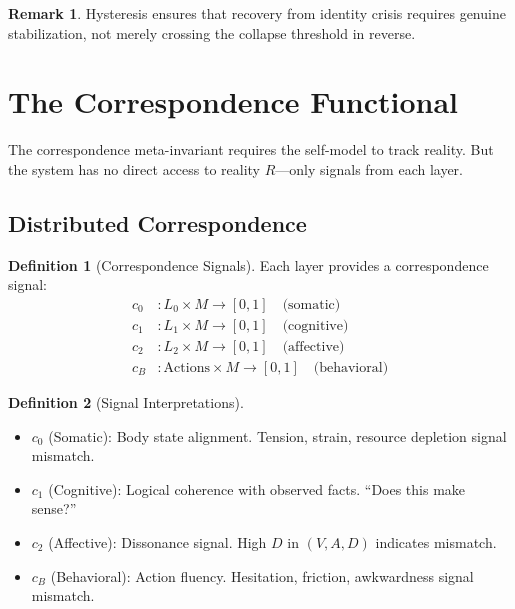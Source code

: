 \documentclass[12pt,a4paper]{article}
\theoremstyle{definition}
\newtheorem{definition}{Definition}[section]
\newtheorem{remark}{Remark}[section]
\begin{document}
\begin{remark}
Hysteresis ensures that recovery from identity crisis requires genuine stabilization, not merely crossing the collapse threshold in reverse.
\end{remark}

\section{The Correspondence Functional}

The correspondence meta-invariant requires the self-model to track reality. But the system has no direct access to reality $R$---only signals from each layer.

\subsection{Distributed Correspondence}

\begin{definition}[Correspondence Signals]
Each layer provides a correspondence signal:
\begin{align}
c_0 &: L_0 \times M \to [0,1] \quad \text{(somatic)} \\
c_1 &: L_1 \times M \to [0,1] \quad \text{(cognitive)} \\
c_2 &: L_2 \times M \to [0,1] \quad \text{(affective)} \\
c_B &: \text{Actions} \times M \to [0,1] \quad \text{(behavioral)}
\end{align}
\end{definition}

\begin{definition}[Signal Interpretations]
\begin{itemize}
    \item $c_0$ (Somatic): Body state alignment. Tension, strain, resource depletion signal mismatch.
    \item $c_1$ (Cognitive): Logical coherence with observed facts. ``Does this make sense?''
    \item $c_2$ (Affective): Dissonance signal. High $D$ in $(V, A, D)$ indicates mismatch.
    \item $c_B$ (Behavioral): Action fluency. Hesitation, friction, awkwardness signal mismatch.
\end{itemize}
\end{definition}
\end{document}
